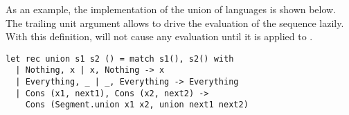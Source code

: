 As an example, the implementation of the union of languages is shown below.
The trailing unit argument \code{()} allows to drive the evaluation of the sequence lazily. With this definition, 
will not cause any evaluation until it is applied to \code{()}.
\begin{lstlisting}
let rec union s1 s2 () = match s1(), s2() with
  | Nothing, x | x, Nothing -> x
  | Everything, _ | _, Everything -> Everything
  | Cons (x1, next1), Cons (x2, next2) -> 
    Cons (Segment.union x1 x2, union next1 next2)
\end{lstlisting}






